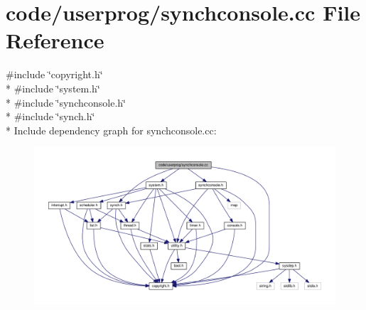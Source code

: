 \section{code/userprog/synchconsole.cc File Reference}
\label{synchconsole_8cc}
{\ttfamily \#include \char`\"{}copyright.\+h\char`\"{}}\\*
{\ttfamily \#include \char`\"{}system.\+h\char`\"{}}\\*
{\ttfamily \#include \char`\"{}synchconsole.\+h\char`\"{}}\\*
{\ttfamily \#include \char`\"{}synch.\+h\char`\"{}}\\*
Include dependency graph for synchconsole.\+cc\+:
\nopagebreak
\begin{figure}[H]
\begin{center}
\leavevmode
\includegraphics[width=350pt]{synchconsole_8cc__incl}
\end{center}
\end{figure}
